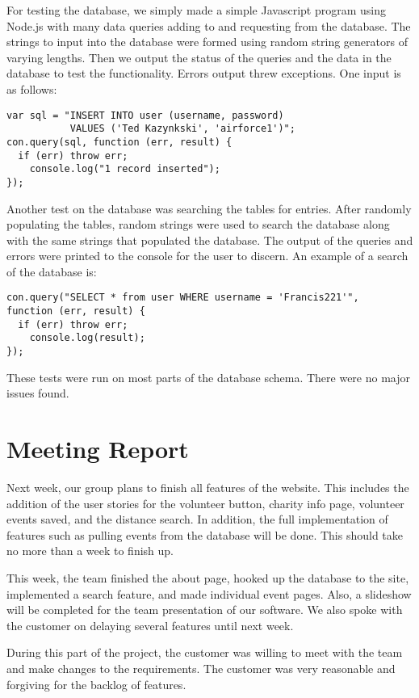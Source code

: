 \documentclass[12pt]{article}
\begin{document}
	For testing the database, we simply made a simple Javascript program using
	Node.js with many data queries adding to and requesting from the database. The
	strings to input into the database were formed using random string generators
	of varying lengths. Then we output the status of the queries and the data in the
	database to test the functionality. Errors output threw exceptions. One
	input is as follows:
\begin{lstlisting}
var sql = "INSERT INTO user (username, password)
           VALUES ('Ted Kazynkski', 'airforce1')";
con.query(sql, function (err, result) {
  if (err) throw err;
    console.log("1 record inserted");
});
\end{lstlisting}

	Another test on the database was searching the tables for entries. After
	randomly populating the tables, random strings were used to search the database
	along with the same strings that populated the database. The output of the
	queries and errors were printed to the console for the user to discern. An example
	of a search of the database is:
\begin{lstlisting}
con.query("SELECT * from user WHERE username = 'Francis221'",
function (err, result) {
  if (err) throw err;
    console.log(result);
});
\end{lstlisting}

	These tests were run on most parts of the database schema. There were no major
	issues found.
\section{Meeting Report}
	Next week, our group plans to finish all features of the website. This
	includes the addition of the user stories for the volunteer button, charity
	info page, volunteer events saved, and the distance search. In addition, the full
	implementation of features such as pulling events from the database will be
	done. This should take no more than a week to finish up.

	This week, the team finished the about page, hooked up the database to the
	site, implemented a search feature, and made individual event pages. Also, a
	slideshow will be completed for the team presentation of our software. We also
	spoke with the customer on delaying several features until next week.

	During this part of the project, the customer was willing to meet with the team
	and make changes to the requirements. The customer was very reasonable and
	forgiving for the backlog of features.
\end{document}
